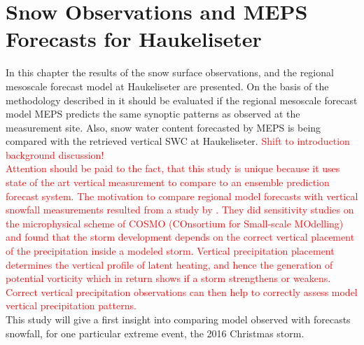 \chapter{Snow Observations and MEPS Forecasts for Haukeliseter}\label{ch:Res}
In this chapter the results of the snow surface observations, 
and the regional mesoscale forecast model at Haukeliseter are presented. On the basis of the methodology described in  it should be evaluated if the regional mesoscale forecast model MEPS predicts the same synoptic patterns as observed at the measurement site. Also, snow water content forecasted by MEPS is being compared with the retrieved vertical SWC at Haukeliseter. 
\textcolor{red}{Shift to introduction background discussion! \\
	Attention should be paid to the fact, that this study is unique because it uses state of the art vertical measurement to compare to an ensemble prediction forecast system. The motivation to compare regional model forecasts with vertical snowfall measurements resulted from a study by \citet{joos_influence_2012}. They did sensitivity studies on the microphysical scheme of COSMO (COnsortium for Small-scale MOdelling) and found that the storm development depends on the correct vertical placement of the precipitation inside a modeled storm. Vertical precipitation placement determines the vertical profile of latent heating, and hence the generation of potential vorticity which in return shows if a storm strengthens or weakens. Correct vertical precipitation observations can then help to correctly assess model vertical precipitation patterns.}
\\
This study will give a first insight into comparing model observed with forecasts snowfall, for one particular extreme event, the 2016 Christmas storm.

